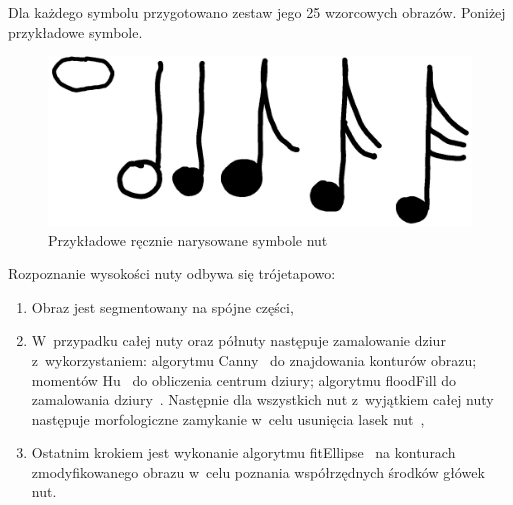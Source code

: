 \documentclass[polish,thesis,12pt]{dcsbook}
\begin{document}
Dla każdego symbolu przygotowano zestaw jego 25 wzorcowych obrazów. Poniżej przykładowe symbole.

\begin{figure}[H]
  \centering
  \includegraphics[scale=0.2,bb=0 0 1637 656]{img/sample.png}
  \caption{Przykładowe ręcznie narysowane symbole nut}
  \label{symbols}
\end{figure}

Rozpoznanie wysokości nuty odbywa się trójetapowo:

\begin{enumerate}
  \item Obraz jest segmentowany na spójne części,
  \item W~przypadku całej nuty oraz półnuty następuje zamalowanie dziur z~wykorzystaniem: algorytmu Canny~\cite{OpenCV:canny} do znajdowania konturów obrazu; momentów Hu~\cite{OpenCV:moments} do obliczenia centrum dziury; algorytmu floodFill do zamalowania dziury~\cite{OpenCV:floodFill}. Następnie dla wszystkich nut z~wyjątkiem całej nuty następuje morfologiczne zamykanie w~celu usunięcia lasek nut~\cite{OpenCV:closing},
  \item Ostatnim krokiem jest wykonanie algorytmu fitEllipse~\cite{OpenCV:fitEllipse} na konturach zmodyfikowanego obrazu w~celu poznania współrzędnych środków główek nut.
\end{enumerate}
\end{document}
